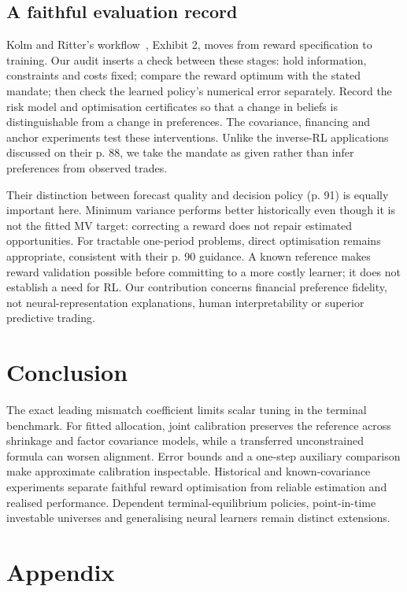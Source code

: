 \documentclass[sigconf,anonymous,review]{acmart}
\begin{document}
\subsection{A faithful evaluation record}
Kolm and Ritter's workflow~\cite{kolm2025}, Exhibit 2, moves from reward specification to training. Our audit inserts a check between these stages: hold information, constraints and costs fixed; compare the reward optimum with the stated mandate; then check the learned policy's numerical error separately. Record the risk model and optimisation certificates so that a change in beliefs is distinguishable from a change in preferences. The covariance, financing and anchor experiments test these interventions. Unlike the inverse-RL applications discussed on their p. 88, we take the mandate as given rather than infer preferences from observed trades.

Their distinction between forecast quality and decision policy (p. 91) is equally important here. Minimum variance performs better historically even though it is not the fitted MV target: correcting a reward does not repair estimated opportunities. For tractable one-period problems, direct optimisation remains appropriate, consistent with their p. 90 guidance. A known reference makes reward validation possible before committing to a more costly learner; it does not establish a need for RL. Our contribution concerns financial preference fidelity, not neural-representation explanations, human interpretability or superior predictive trading.

\section{Conclusion}
The exact leading mismatch coefficient limits scalar tuning in the terminal benchmark. For fitted allocation, joint calibration preserves the reference across shrinkage and factor covariance models, while a transferred unconstrained formula can worsen alignment. Error bounds and a one-step auxiliary comparison make approximate calibration inspectable. Historical and known-covariance experiments separate faithful reward optimisation from reliable estimation and realised performance. Dependent terminal-equilibrium policies, point-in-time investable universes and generalising neural learners remain distinct extensions.



\clearpage
\appendix
\section*{Appendix}
\end{document}
